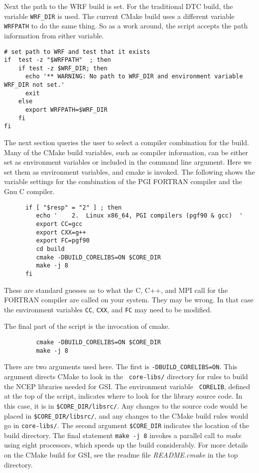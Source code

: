 Next the path to the WRF build is set. For the traditional DTC build, the variable \verb|WRF_DIR| is used. The current CMake build uses a different variable \verb|WRFPATH| to do the same thing. So as a work around, the script accepts the path information from either variable. 
\begin{small}
\begin{verbatim}
# set path to WRF and test that it exists
if  test -z "$WRFPATH"  ; then
    if test -z $WRF_DIR; then
      echo '** WARNING: No path to WRF_DIR and environment variable WRF_DIR not set.'
      exit
    else
      export WRFPATH=$WRF_DIR
    fi
fi
\end{verbatim}
\end{small}

The next section queries the user to select a compiler combination for the build. Many of the CMake build variables, such as compiler information, can be either set as environment variables or included in the command line argument. Here we set them as environment variables, and cmake is invoked. The following shows the variable settings for the combination of the PGI FORTRAN compiler and the Gnu C compiler. 
\begin{small}
\begin{verbatim}
      if [ "$resp" = "2" ] ; then
         echo '    2.  Linux x86_64, PGI compilers (pgf90 & gcc)  '
         export CC=gcc
         export CXX=g++
         export FC=pgf90
         cd build
         cmake -DBUILD_CORELIBS=ON $CORE_DIR
         make -j 8
      fi 
\end{verbatim}
\end{small}
These are standard guesses as to what the C, C++, and MPI call for the FORTRAN compiler are called on your system. They may be wrong. In that case the environment variables \verb|CC|, \verb|CXX|, and \verb|FC| may need to be modified. 

The final part of the script is the invocation of cmake. 
\begin{small}
\begin{verbatim}
         cmake -DBUILD_CORELIBS=ON $CORE_DIR
         make -j 8
\end{verbatim}
\end{small}
There are two arguments used here. The first is \verb|-DBUILD_CORELIBS=ON|. This argument directs CMake to look in the \verb| core-libs/| directory for rules to build the NCEP libraries needed for GSI. The environment variable \verb| CORELIB|, defined at the top of the script, indicates where to look for the library source code. In this case, it is in \verb|$CORE_DIR/libsrc/|. Any changes to the source code would be placed in \verb|$CORE_DIR/libsrc/|, and any changes to the CMake build rules would go in \verb|core-libs/|. The second argument \verb|$CORE_DIR| indicates the location of the build directory. The final statement \verb|make -j 8| invokes a parallel call to \textit{make} using eight processors, which speeds up the build considerably. For more details on the CMake build for GSI, see the readme file \textit{README.cmake} in the top directory. 
